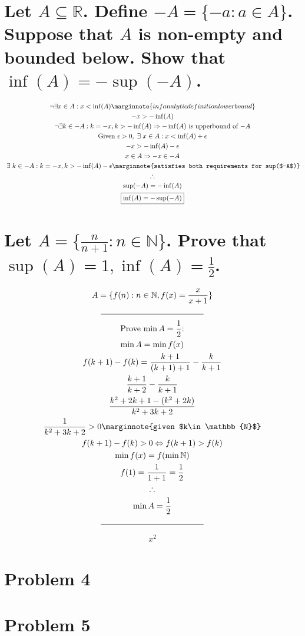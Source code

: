 \documentclass[letterpaper]{article}
\begin{document}
\section{Let $A \subseteq \mathbb{R}$. Define $-A=\{-a:a\in A\}$. Suppose that $A$ is non-empty and bounded below. Show that
$\inf(A)=-\sup(-A)$.}
\begin{gather*}
\lnot\exists x \in A: x < \inf(A) \marginnote{inf analytic definition lower bound} \\
-x>-\inf(A) \\
\lnot\exists{k}\in-A:k=-x,k>-\inf(A) \Rightarrow -\inf(A) \text{ is upperbound of $-A$} \\ 
\text{Given } \epsilon>0,\hspace{3pt}\exists\hspace{3pt}x\in A:x<\inf(A)+\epsilon \\
-x > -\inf(A) - \epsilon \\
x\in A \Rightarrow -x\in -A \\
\hspace{3pt}\exists\hspace{3pt}k\in -A:k=-x,k>-\inf(A)-\epsilon \marginnote{satisfies both requirements for sup($-A$)} \\
\therefore \\
\sup(-A)=-\inf(A) \\
\boxed{\inf(A)=-\sup(-A)}
\end{gather*}

\section{Let $A=\{\frac{n}{n+1}:n\in\mathbb{N}\}$. Prove that $\sup(A)=1, \inf(A)=\frac{1}{2}$.}
\begin{gather*}
A=\{f(n):n\in\mathbb{N},f(x)=\frac{x}{x+1}\} \\
\line(1, 0){125} \\
\text{Prove $\min A=\frac{1}{2}$:} \\
\min A = \min f(x) \\
f(k+1)-f(k)=\frac{k+1}{(k+1)+1}-\frac{k}{k+1} \\
\frac{k+1}{k+2}-\frac{k}{k+1} \\
\frac{k^2+2k+1-(k^2+2k)}{k^2+3k+2} \\
\frac{1}{k^2+3k+2}>0 \marginnote{given $k\in\mathbb{N}$} \\
f(k+1)-f(k)>0\Leftrightarrow f(k+1)>f(k) \\
\min f(x) = f(\min \mathbb{N}) \\
f(1) = \frac{1}{1+1} = \frac{1}{2} \\
\therefore \\
\min A = \frac{1}{2} \\
\line(1, 0){125}
\end{gather*}
\begin{gather*}
x^2
\end{gather*}

\section{Problem 4}

\section{Problem 5}
\end{document}
